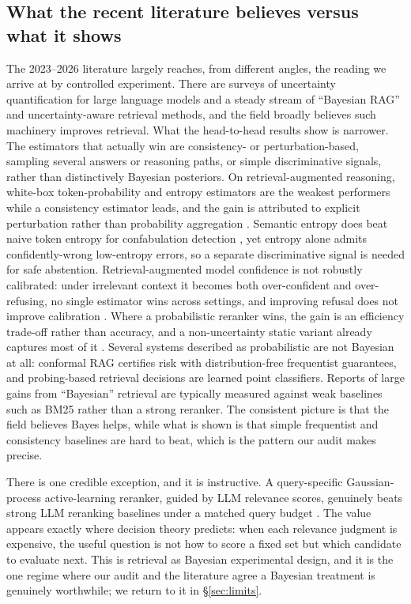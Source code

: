 \documentclass[11pt]{article}
\begin{document}
\subsection*{What the recent literature believes versus what it shows}

The 2023--2026 literature largely reaches, from different angles, the reading we arrive at by controlled
experiment. There are surveys of uncertainty quantification for large language models
\citep{uqsurvey2025} and a steady stream of ``Bayesian RAG'' and uncertainty-aware retrieval methods,
and the field broadly believes such machinery improves retrieval. What the head-to-head results show is
narrower. The estimators that actually win are consistency- or perturbation-based, sampling several
answers or reasoning paths, or simple discriminative signals, rather than distinctively Bayesian
posteriors. On retrieval-augmented reasoning, white-box token-probability and entropy estimators are the
weakest performers while a consistency estimator leads, and the gain is attributed to explicit
perturbation rather than probability aggregation \citep{soudani2025uqrar}. Semantic entropy does beat
naive token entropy for confabulation detection \citep{farquhar2024semantic}, yet entropy alone admits
confidently-wrong low-entropy errors, so a separate discriminative signal is needed for safe abstention.
Retrieval-augmented model confidence is not robustly calibrated: under irrelevant context it becomes
both over-confident and over-refusing, no single estimator wins across settings, and improving refusal
does not improve calibration \citep{ralm2025know}. Where a probabilistic reranker wins, the gain is an
efficiency trade-off rather than accuracy, and a non-uncertainty static variant already captures most of
it \citep{acurank2025}. Several systems described as probabilistic are not Bayesian at all: conformal RAG
certifies risk with distribution-free frequentist guarantees, and probing-based retrieval decisions are
learned point classifiers. Reports of large gains from ``Bayesian'' retrieval are typically measured
against weak baselines such as BM25 rather than a strong reranker. The consistent picture is that the
field believes Bayes helps, while what is shown is that simple frequentist and consistency baselines are
hard to beat, which is the pattern our audit makes precise.

There is one credible exception, and it is instructive. A query-specific Gaussian-process active-learning
reranker, guided by LLM relevance scores, genuinely beats strong LLM reranking baselines under a matched
query budget \citep{bagel2026}. The value appears exactly where decision theory predicts: when each
relevance judgment is expensive, the useful question is not how to score a fixed set but which candidate
to evaluate next. This is retrieval as Bayesian experimental design, and it is the one regime where our
audit and the literature agree a Bayesian treatment is genuinely worthwhile; we return to it in
\S\ref{sec:limits}.
\end{document}
